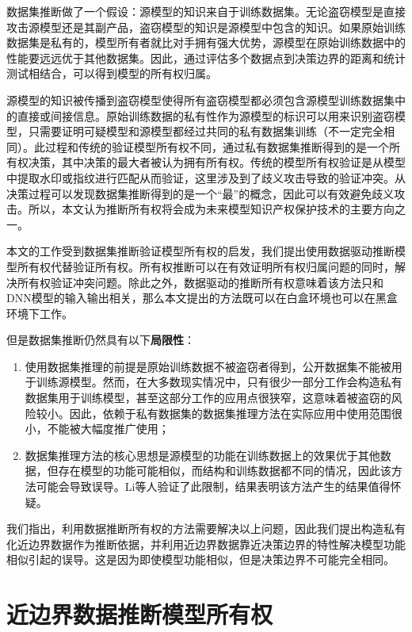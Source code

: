 数据集推断做了一个假设：源模型的知识来自于训练数据集。无论盗窃模型是直接攻击源模型还是其副产品，盗窃模型的知识是源模型中包含的知识。如果原始训练数据集是私有的，模型所有者就比对手拥有强大优势，源模型在原始训练数据中的性能要远远优于其他数据集。因此，通过评估多个数据点到决策边界的距离和统计测试相结合，可以得到模型的所有权归属。

源模型的知识被传播到盗窃模型使得所有盗窃模型都必须包含源模型训练数据集中的直接或间接信息。原始训练数据的私有性作为源模型的标识可以用来识别盗窃模型，只需要证明可疑模型和源模型都经过共同的私有数据集训练（不一定完全相同）。此过程和传统的验证模型所有权不同，通过私有数据集推断得到的是一个所有权决策，其中决策的最大者被认为拥有所有权。传统的模型所有权验证是从模型中提取水印或指纹进行匹配从而验证，这里涉及到了歧义攻击导致的验证冲突。从决策过程可以发现数据集推断得到的是一个“最”的概念，因此可以有效避免歧义攻击。所以，本文认为推断所有权将会成为未来模型知识产权保护技术的主要方向之一。

本文的工作受到数据集推断验证模型所有权的启发，我们提出使用数据驱动推断模型所有权代替验证所有权。所有权推断可以在有效证明所有权归属问题的同时，解决所有权验证冲突问题。除此之外，数据驱动的推断所有权意味着该方法只和DNN模型的输入输出相关，那么本文提出的方法既可以在白盒环境也可以在黑盒环境下工作。

但是数据集推断仍然具有以下\textbf{局限性}：

\begin{enumerate}
	\renewcommand{\labelenumi}{\theenumi)}
	\item 使用数据集推理的前提是原始训练数据不被盗窃者得到，公开数据集不能被用于训练源模型。然而，在大多数现实情况中，只有很少一部分工作会构造私有数据集用于训练模型，甚至这部分工作的应用点很狭窄，这意味着被盗窃的风险较小。因此，依赖于私有数据集的数据集推理方法在实际应用中使用范围很小，不能被大幅度推广使用；
	\item 数据集推理方法的核心思想是源模型的功能在训练数据上的效果优于其他数据，但存在模型的功能可能相似，而结构和训练数据都不同的情况，因此该方法可能会导致误导。Li等人\cite{lao2022deepauth}验证了此限制，结果表明该方法产生的结果值得怀疑。
\end{enumerate}

我们指出，利用数据推断所有权的方法需要解决以上问题，因此我们提出构造私有化近边界数据作为推断依据，并利用近边界数据靠近决策边界的特性解决模型功能相似引起的误导。这是因为即使模型功能相似，但是决策边界不可能完全相同。

\section{近边界数据推断模型所有权}\label{4.2}

